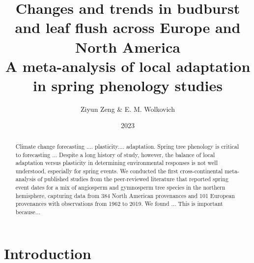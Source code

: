 \documentclass{article}
\begin{document}
\title{{\huge Changes and trends in budburst and leaf flush across Europe and North America} \\A meta-analysis of local adaptation in spring phenology studies}
\author{Ziyun Zeng \& E. M. Wolkovich}
\date{2023}
\maketitle 


\newpage


\begin{abstract}
Climate change forecasting .... plasticity.... adaptation. Spring tree phenology is critical to forecasting ... Despite a long history of study, however, the balance of local adaptation versus plasticity in determining environmental responses is not well understood, especially for spring events. We conducted the first cross-continental meta-analysis of published studies from the peer-reviewed literature that reported spring event dates for a mix of angiosperm and gymnosperm tree species in the northern hemisphere, capturing data from 384 North American provenances and 101 European provenances with observations from 1962 to 2019.  We found ... This is important because... 
\end{abstract}


\section{Introduction}
\end{document}
